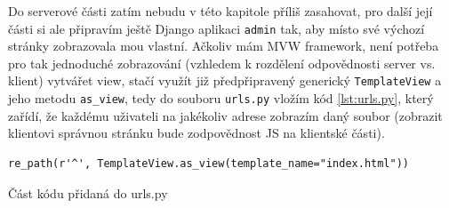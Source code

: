     Do serverové části zatím nebudu v této kapitole příliš zasahovat, pro další její části si ale připravím ještě Django aplikaci \verb|admin| tak, aby místo své výchozí stránky zobrazovala mou vlastní. Ačkoliv mám MVW framework, není potřeba pro tak jednoduché zobrazování (vzhledem k rozdělení odpovědnosti server vs. klient) vytvářet view, stačí využít již předpřipravený generický \verb|TemplateView| a jeho metodu \verb|as_view|, tedy do souboru \verb|urls.py| vložím kód \ref{lst:urls.py}, který zařídí, že každému uživateli na jakékoliv adrese zobrazím daný soubor (zobrazit klientovi správnou stránku bude zodpovědnost JS na klientské části).
    
    \begin{listing}[ht]
    	\begin{verbatim}
re_path(r'^', TemplateView.as_view(template_name="index.html"))
    	\end{verbatim}
    	\caption{Část kódu přidaná do urls.py}\label{lst:urls.py}
    \end{listing}
    
